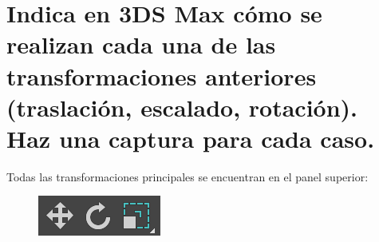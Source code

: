 \documentclass{article}
\begin{document}
\section{Indica en 3DS Max cómo se realizan cada una de las transformaciones anteriores (traslación, escalado, rotación). Haz una captura para cada caso.}

Todas las transformaciones principales se encuentran en el panel superior:

\begin{figure}[H]
    \centering
    \includegraphics[width=\textwidth]{imagenes/tools.png}
 \end{figure}
\end{document}
